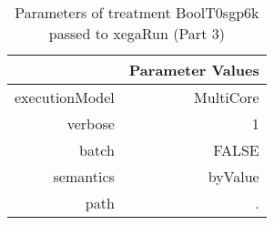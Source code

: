 \begin{table}[ht]
\centering
\begin{tabular}{rr}
  \hline
 & Parameter Values \\ 
  \hline
executionModel & MultiCore \\ 
  verbose & 1 \\ 
  batch & FALSE \\ 
  semantics & byValue \\ 
  path & . \\ 
   \hline
\end{tabular}
\caption{ Parameters of treatment BoolT0sgp6k passed to xegaRun
 (Part 3)} 
\end{table}
